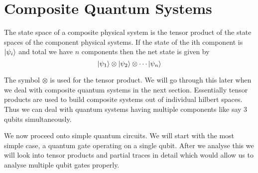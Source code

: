 \section{Composite Quantum Systems}
\begin{postulate}
The state space of a composite physical system is the tensor product
of the state spaces of the component physical systems. If the state of the ith component is $\ket{\psi_i}$ and total we have $n$ components then the net state is given by 
$$ \ket{\psi_1} \otimes \ket{\psi_2} \otimes \cdots \ket{\psi_n}$$
\end{postulate}

The symbol $\otimes$ is used for the tensor product. We will go through this later when we deal with composite quantum systems in the next section. Essentially tensor products are used to build composite systems out of individual hilbert spaces. Thus we can deal with quantum systems having multiple components like say 3 qubits simultaneously.

We now proceed onto simple quantum circuits. We will start with the most simple case, a quantum gate operating on a single qubit. After we analyse this we will look into tensor products and partial traces in detail which would allow us to analyse multiple qubit gates properly.

\clearpage